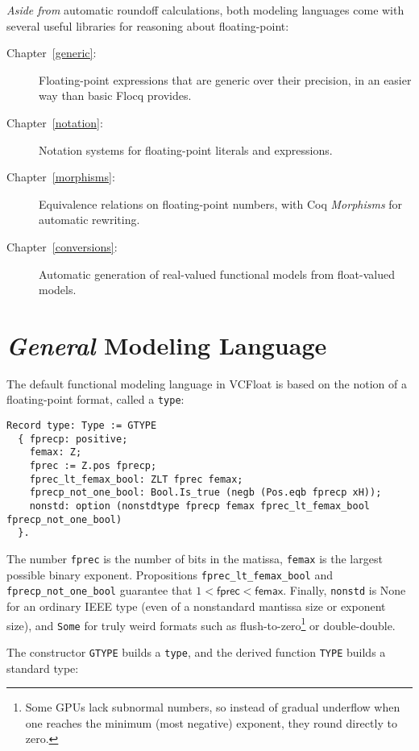 \documentclass[article]{memoir}
\begin{document}
\emph{Aside from} automatic roundoff calculations, both modeling languages come with several useful libraries for reasoning about floating-point:
\begin{description}
\item[Chapter~\ref{generic}:] Floating-point expressions that are generic over their precision, in an easier way than basic Flocq provides.
\item[Chapter~\ref{notation}:] Notation systems for floating-point literals and expressions.
\item[Chapter~\ref{morphisms}:] Equivalence relations on floating-point numbers, with Coq \emph{Morphisms} for automatic rewriting.
\item[Chapter~\ref{conversions}:] Automatic generation of real-valued functional models from float-valued models.
\end{description}

\pagebreak

\chapter{\emph{General} Modeling Language}

The default functional modeling language in VCFloat is based on the notion of a floating-point format, called a \lstinline{type}:
\begin{lstlisting}
Record type: Type := GTYPE
  { fprecp: positive;
    femax: Z;
    fprec := Z.pos fprecp;
    fprec_lt_femax_bool: ZLT fprec femax;
    fprecp_not_one_bool: Bool.Is_true (negb (Pos.eqb fprecp xH));
    nonstd: option (nonstdtype fprecp femax fprec_lt_femax_bool fprecp_not_one_bool)
  }.
\end{lstlisting}
The number \lstinline{fprec} is the number of bits in the matissa, \lstinline{femax} is the largest possible binary exponent.
Propositions \lstinline{fprec_lt_femax_bool} and \lstinline{fprecp_not_one_bool} guarantee that $1 < \mathsf{fprec} < \mathsf{femax}$.
Finally, \lstinline{nonstd} is None for an ordinary IEEE type (even of a nonstandard mantissa size or exponent size),
and \lstinline{Some} for truly weird formats such as flush-to-zero\footnote{Some GPUs lack subnormal numbers, so instead of gradual underflow when one reaches the minimum (most negative) exponent, they round directly to zero.} or double-double.

The constructor \lstinline{GTYPE} builds a \lstinline{type}, and the derived function \lstinline{TYPE} builds a standard type:
\end{document}
